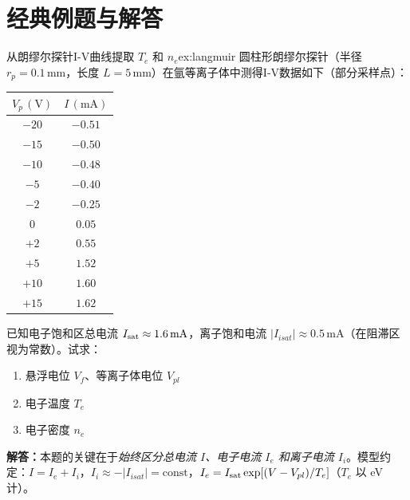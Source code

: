 ﻿%


\section{经典例题与解答}

\begin{example}{从朗缪尔探针I-V曲线提取 $T_e$ 和 $n_e$}{ex:langmuir}
圆柱形朗缪尔探针（半径 $r_p=0.1\,\mathrm{mm}$，长度 $L=5\,\mathrm{mm}$）在氩等离子体中测得I-V数据如下（部分采样点）：
\begin{center}
\begin{tabular}{c|c}
    $V_p\,\mathrm{(V)}$ & $I\,\mathrm{(mA)}$ \\
    \hline
    $-20$ & $-0.51$ \\
    $-15$ & $-0.50$ \\
    $-10$ & $-0.48$ \\
    $-5$  & $-0.40$ \\
    $-2$  & $-0.25$ \\
    $0$   & $0.05$  \\
    $+2$  & $0.55$  \\
    $+5$  & $1.52$  \\
    $+10$ & $1.60$  \\
    $+15$ & $1.62$  \\
\end{tabular}
\end{center}
已知电子饱和区总电流 $I_{\rm sat}\approx1.6\,\mathrm{mA}$，离子饱和电流 $|I_{isat}|\approx0.5\,\mathrm{mA}$（在阻滞区视为常数）。试求：
\begin{enumerate}
    \item 悬浮电位 $V_f$、等离子体电位 $V_{pl}$
    \item 电子温度 $T_e$
    \item 电子密度 $n_e$
\end{enumerate}
\end{example}

\textbf{解答：}本题的关键在于\emph{始终区分总电流 $I$、电子电流 $I_e$ 和离子电流 $I_i$}。模型约定：$I = I_e + I_i$，$I_i \approx -|I_{isat}| = \text{const}$，$I_e = I_{\rm sat}\exp[(V - V_{pl})/T_e]$（$T_e$ 以 eV 计）。

